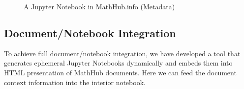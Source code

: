 \begin{figure}[ht]\centering
  \caption{A Jupyter Notebook in MathHub.info (Metadata)}\label{fig:mathhub-NB}
\end{figure}


\subsection{Document/Notebook Integration}

To achieve full document/notebook integration, we have developed a tool that generates ephemeral Jupyter Notebooks dynamically and embeds them into HTML presentation of MathHub documents.
Here we can feed the document context information into the interior notebook.

